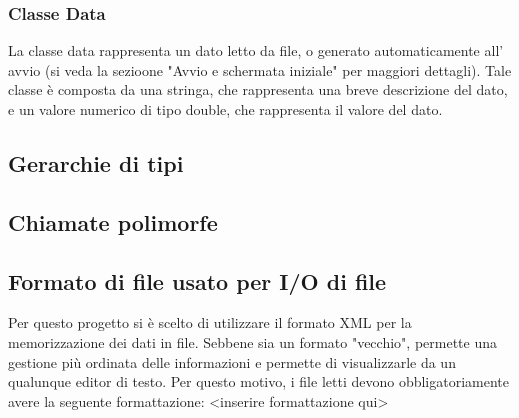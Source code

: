 \documentclass[10pt]{article}
\begin{document}
    \subsubsection{Classe Data}
    La classe data rappresenta un dato letto da file, o generato automaticamente all' avvio (si veda la sezioone "Avvio e schermata iniziale" per maggiori dettagli).
    Tale classe è composta da una stringa, che rappresenta una breve descrizione del dato, e un valore numerico di tipo double, che rappresenta il valore del dato.
    \subsection{Gerarchie di tipi}
    \subsection{Chiamate polimorfe}
    \subsection{Formato di file usato per I/O di file}
    Per questo progetto si è scelto di utilizzare il formato XML per la memorizzazione dei dati in file. Sebbene sia un formato "vecchio", permette una gestione più ordinata delle informazioni e permette di visualizzarle da un qualunque editor di testo.
    Per questo motivo, i file letti devono obbligatoriamente avere la seguente formattazione: <inserire formattazione qui>
	
\end{document}
